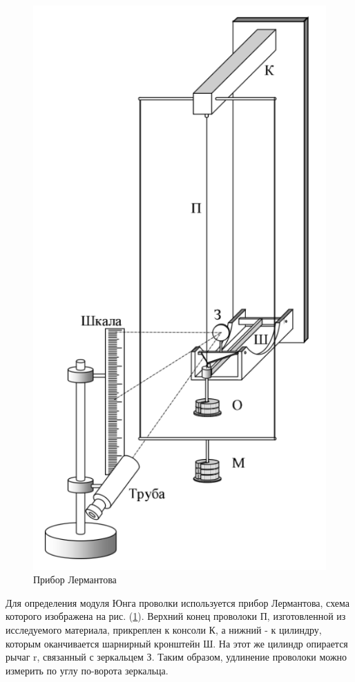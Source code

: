 \documentclass[a4paper,12pt]{article}
\numberwithin{equation}{section}
\begin{document}
\begin{figure} [H] \center
  \includegraphics[scale=0.5]{data/pic 1.png}
  \caption[Рис. 1]{Прибор Лермантова} \label{pic:1}
\end{figure}

Для определения модуля Юнга проволки используется прибор Лермантова, схема которого изображена на рис. (\ref{pic:1}). Верхний конец проволоки П, изготовленной из исследуемого материала, прикреплен к консоли К, а нижний - к цилиндру, которым оканчивается шарнирный кронштейн Ш. На этот же цилиндр опирается рычаг r, связанный с зеркальцем З. Таким образом, удлинение проволоки можно измерить по углу по-ворота зеркальца.
\end{document}
